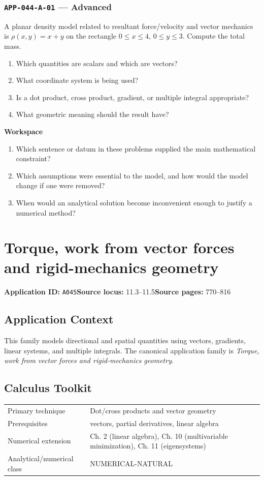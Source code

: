 \documentclass[11pt]{book}
\newcommand{\pid}[1]{\texttt{#1}}
\newcommand{\workspace}{\par\vspace{0.7in}\hrulefill\par\vspace{0.55in}\hrulefill\par}
\begin{document}
\subsection*{\pid{APP-044-A-01} — Advanced}
\begin{problembox}
A planar density model related to resultant force/velocity and vector mechanics is $\rho(x,y)=x+y$ on the rectangle $0\le x\le 4$, $0\le y\le 3$. Compute the total mass.
\end{problembox}
\begin{promptbox}\begin{enumerate}
\item Which quantities are scalars and which are vectors?
\item What coordinate system is being used?
\item Is a dot product, cross product, gradient, or multiple integral appropriate?
\item What geometric meaning should the result have?
\end{enumerate}\end{promptbox}
\textbf{Workspace}\workspace
\begin{reflectionbox}\begin{enumerate}
\item Which sentence or datum in these problems supplied the main mathematical constraint?
\item Which assumptions were essential to the model, and how would the model change if one were removed?
\item When would an analytical solution become inconvenient enough to justify a numerical method?
\end{enumerate}\end{reflectionbox}
\chapter{Torque, work from vector forces and rigid-mechanics geometry}\label{app:A045}
\textbf{Application ID:} \pid{A045}\quad \textbf{Source locus:} 11.3–11.5\quad \textbf{Source pages:} 770–816
\section*{Application Context}
This family models directional and spatial quantities using vectors, gradients, linear systems, and multiple integrals. The canonical application family is \emph{Torque, work from vector forces and rigid-mechanics geometry}.
\section*{Calculus Toolkit}
\begin{tabularx}{\textwidth}{@{}lX@{}}\toprule
Primary technique & Dot/cross products and vector geometry \\
Prerequisites & vectors, partial derivatives, linear algebra \\
Numerical extension & Ch. 2 (linear algebra), Ch. 10 (multivariable minimization), Ch. 11 (eigensystems) \\
Analytical/numerical class & NUMERICAL-NATURAL \\
\bottomrule\end{tabularx}
\end{document}
